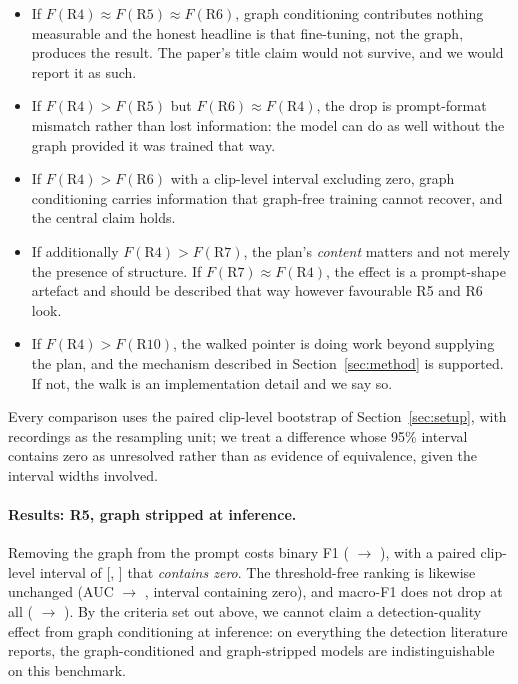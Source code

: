 \documentclass[10pt,twocolumn]{article}
\begin{document}
\begin{itemize}\itemsep2pt
\item If $F(\text{R4}) \approx F(\text{R5}) \approx F(\text{R6})$, graph
      conditioning contributes nothing measurable and the honest headline is
      that fine-tuning, not the graph, produces the result. The paper's title
      claim would not survive, and we would report it as such.
\item If $F(\text{R4}) > F(\text{R5})$ but $F(\text{R6}) \approx F(\text{R4})$,
      the drop is prompt-format mismatch rather than lost information: the model
      can do as well without the graph provided it was trained that way.
\item If $F(\text{R4}) > F(\text{R6})$ with a clip-level interval excluding
      zero, graph conditioning carries information that graph-free training
      cannot recover, and the central claim holds.
\item If additionally $F(\text{R4}) > F(\text{R7})$, the plan's \emph{content}
      matters and not merely the presence of structure. If $F(\text{R7}) \approx
      F(\text{R4})$, the effect is a prompt-shape artefact and should be
      described that way however favourable R5 and R6 look.
\item If $F(\text{R4}) > F(\text{R10})$, the walked pointer is doing work beyond
      supplying the plan, and the mechanism described in
      Section~\ref{sec:method} is supported. If not, the walk is an
      implementation detail and we say so.
\end{itemize}

Every comparison uses the paired clip-level bootstrap of
Section~\ref{sec:setup}, with recordings as the resampling unit; we treat a
difference whose 95\% interval contains zero as unresolved rather than as
evidence of equivalence, given the interval widths involved.

\paragraph{Results: R5, graph stripped at inference.}
Removing the graph from the prompt costs \ngDelta{} binary F1 (\resF{} $\to$
\ngF{}), with a paired clip-level interval of [\ngDeltaLo{}, \ngDeltaHi{}] that
\emph{contains zero}. The threshold-free ranking is likewise unchanged (AUC
\resAUC{} $\to$ \ngAUC{}, interval containing zero), and macro-F1 does not drop
at all (\resMacro{} $\to$ \ngMacro{}). By the criteria set out above, we cannot
claim a detection-quality effect from graph conditioning at inference: on
everything the detection literature reports, the graph-conditioned and
graph-stripped models are indistinguishable on this benchmark.
\end{document}
